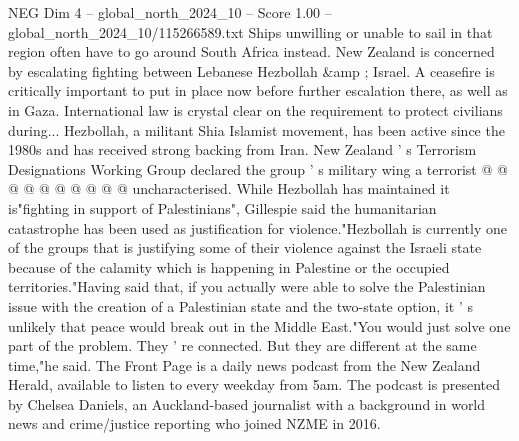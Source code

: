 \begin{textsample}{NEG Dim 4 – global\_north\_2024\_10 – Score 1.00 – global\_north\_2024\_10/115266589.txt}
Ships unwilling or unable to sail in that region often have to go around South Africa instead.
New Zealand is concerned by escalating fighting between Lebanese Hezbollah \&amp ; Israel.
A ceasefire is critically important to put in place now before further escalation there, as well as in Gaza.
International law is crystal clear on the requirement to protect civilians during...
Hezbollah, a militant Shia Islamist movement, has been active since the 1980s and has received strong backing from Iran.
New Zealand ' s Terrorism Designations Working Group declared the group ' s military wing a terrorist @ @ @ @ @ @ @ @ @ @ uncharacterised.
While Hezbollah has maintained it is"fighting in support of Palestinians", Gillespie said the humanitarian catastrophe has been used as justification for violence."Hezbollah is currently one of the groups that is justifying some of their violence against the Israeli state because of the calamity which is happening in Palestine or the occupied territories."Having said that, if you actually were able to solve the Palestinian issue with the creation of a Palestinian state and the two-state option, it ' s unlikely that peace would break out in the Middle East."You would just solve one part of the problem.
They ' re connected.
But they are different at the same time,"he said.
The Front Page is a daily news podcast from the New Zealand Herald, available to listen to every weekday from 5am.
The podcast is presented by Chelsea Daniels, an Auckland-based journalist with a background in world news and crime/justice reporting who joined NZME in 2016.

\end{textsample}
